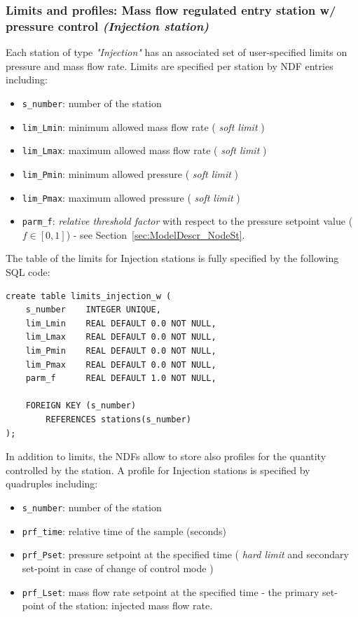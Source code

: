 \subsubsection{Limits and profiles: Mass flow regulated entry station w/ pressure control \textit{(Injection station)}}
Each station of type \textit{"Injection"} has an associated set of user-specified limits on pressure
and mass flow rate. Limits are specified per station by NDF entries including:
\begin{itemize}
    \item \texttt{s\_number}:   number of the station
    \item \texttt{lim\_Lmin}:   minimum allowed mass flow rate ( \textit{soft limit} )
    \item \texttt{lim\_Lmax}:   maximum allowed mass flow rate ( \textit{soft limit} )
    \item \texttt{lim\_Pmin}:   minimum allowed pressure ( \textit{soft limit} )
    \item \texttt{lim\_Pmax}:   maximum allowed pressure ( \textit{soft limit} )
    \item \texttt{parm\_f}:     \textit{relative threshold factor} with respect to the pressure setpoint value ($f \in [0, 1]$) - see Section~\ref{sec:ModelDescr_NodeSt}.
\end{itemize}
The table of the limits for Injection stations is fully specified by the following SQL code:
\begin{verbatim}
create table limits_injection_w (
    s_number    INTEGER UNIQUE,
    lim_Lmin    REAL DEFAULT 0.0 NOT NULL,
    lim_Lmax    REAL DEFAULT 0.0 NOT NULL,
    lim_Pmin    REAL DEFAULT 0.0 NOT NULL,
    lim_Pmax    REAL DEFAULT 0.0 NOT NULL,
    parm_f      REAL DEFAULT 1.0 NOT NULL,

    FOREIGN KEY (s_number)
        REFERENCES stations(s_number)
);
\end{verbatim}
In addition to limits, the NDFs allow to store also profiles for the quantity
controlled by the station. A profile for Injection stations is specified by quadruples including:
\begin{itemize}
    \item \texttt{s\_number}:   number of the station
    \item \texttt{prf\_time}:   relative time of the sample (seconds)
    \item \texttt{prf\_Pset}:   pressure setpoint at the specified time ( \textit{hard limit} and secondary set-point in case of change of control mode )
    \item \texttt{prf\_Lset}:   mass flow rate setpoint at the specified time - the primary set-point of the station: injected mass flow rate.
\end{itemize}
